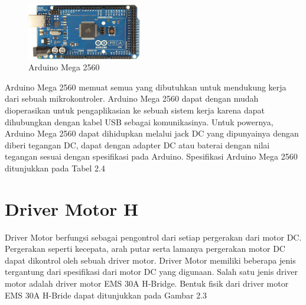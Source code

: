 	\begin{figure}[H]
	\centering
	\includegraphics[width=5cm]{gambar/arduino_mega.jpg}
	\caption{Arduino Mega 2560}
\end{figure}

Arduino Mega 2560 memuat semua yang dibutuhkan untuk mendukung kerja dari sebuah mikrokontroler. Arduino Mega 2560 dapat dengan mudah dioperasikan untuk pengaplikasian ke sebuah sistem kerja karena dapat dihubungkan dengan kabel USB sebagai komunikasinya. Untuk powernya, Arduino Mega 2560 dapat dihidupkan melalui jack DC yang dipunyainya dengan diberi tegangan DC, dapat dengan adapter DC atau baterai dengan nilai tegangan sesuai dengan spesifikasi pada Arduino. Spesifikasi Arduino Mega 2560 ditunjukkan pada Tabel 2.4
\begin{table}[H]
	\centering
	\caption{ Spesifikasi Arduino Mega 2560 }
\end{table}

\section{Driver Motor H}
Driver Motor berfungsi sebagai pengontrol dari setiap pergerakan dari motor DC. Pergerakan seperti kecepata, arah putar serta lamanya pergerakan motor DC dapat dikontrol oleh sebuah driver motor. Driver Motor memiliki beberapa jenis tergantung dari spesifikasi dari motor DC yang digunaan. Salah satu jenis driver motor adalah driver motor EMS 30A H-Bridge. Bentuk fisik dari driver motor EMS 30A H-Bride dapat ditunjukkan pada Gambar 2.3

